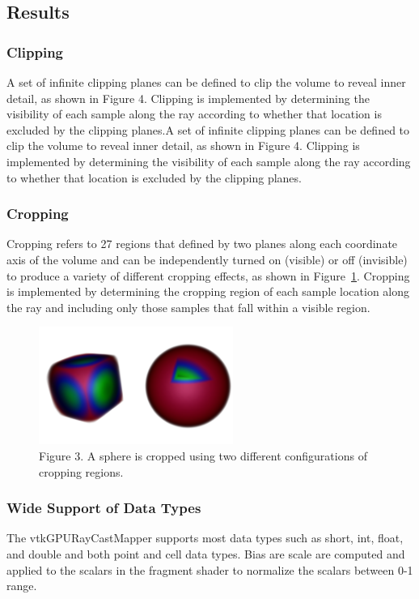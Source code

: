 \subsection{Results}
\subsubsection{Clipping}
A set of infinite clipping planes can be defined to clip the volume to reveal inner detail, as shown in Figure 4.  Clipping is implemented by determining the visibility of each sample along the ray according to whether that location is excluded by the clipping planes.A set of infinite clipping planes can be defined to clip the volume to reveal inner detail, as shown in Figure 4.  Clipping is implemented by determining the visibility of each sample along the ray according to whether that location is excluded by the clipping planes.

\subsubsection{Cropping}
Cropping refers to 27 regions that defined by two planes along each coordinate axis of the volume and can be independently turned on (visible) or off (invisible) to produce a variety of different cropping effects, as shown in Figure~\ref{fig:cropping}. Cropping is implemented by determining the cropping region of each sample location along the ray and including only those samples that fall within a visible region.

\begin{figure}
\centering
\includegraphics[width=2.5in]{SphereCropping.png}
\caption{Figure 3. A sphere is cropped using two different configurations of cropping regions.}
\label{fig:cropping}
\end{figure}

\subsubsection{Wide Support of Data Types} 
The vtkGPURayCastMapper supports most data types such as short, int, float, and double and both point and cell data types. Bias are scale are computed and applied to the scalars in the fragment shader to normalize the scalars between 0-1 range. 

